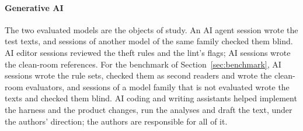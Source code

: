 \paragraph{Generative AI}
The two evaluated models are the objects of study. An AI agent session wrote the test texts, and sessions of another model of the same family checked them blind. AI editor sessions reviewed the theft rules and the lint's flags; AI sessions wrote the clean-room references. For the benchmark of Section~\ref{sec:benchmark}, AI sessions wrote the rule sets, checked them as second readers and wrote the clean-room evaluators, and sessions of a model family that is not evaluated wrote the texts and checked them blind. AI coding and writing assistants helped implement the harness and the product changes, run the analyses and draft the text, under the authors' direction; the authors are responsible for all of it.
